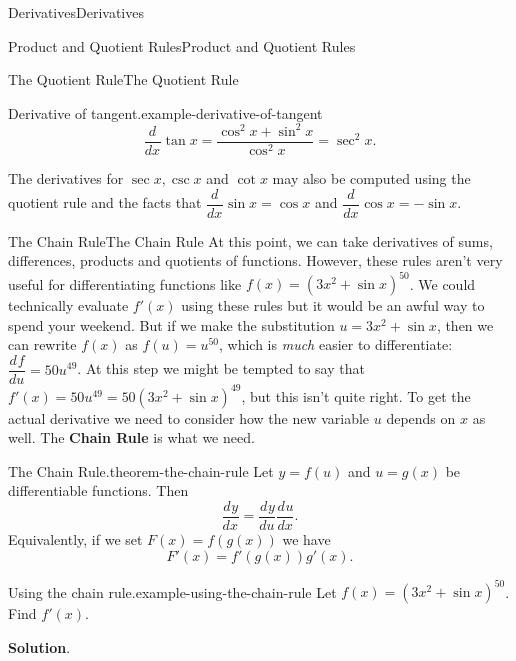 \documentclass[10pt,]{book}
\newcommand{\terminology}[1]{\textbf{#1}}
\numberwithin{equation}{section}
\newcommand{\dv}[3][]{\dfrac{d^{#1} #2}{d #3^{#1}}}
\begin{document}
\begin{chapterptx}{Derivatives}{}{Derivatives}{}{}
\begin{sectionptx}{Product and Quotient Rules}{}{Product and Quotient Rules}{}{}
\begin{subsectionptx}{The Quotient Rule}{}{The Quotient Rule}{}{}
\begin{example}{Derivative of tangent.}{example-derivative-of-tangent}
\begin{equation*}
\dv{}{x}\tan x = \frac{\cos^{2}x + \sin^{2}x}{\cos^{2}x} = \sec^{2}x.
\end{equation*}
%
\end{example}
\hypertarget{p-148}{}%
The derivatives for \(\sec x, \csc x\) and \(\cot x\) may also be computed using the quotient rule and the facts that \(\dv{}{x}\sin x = \cos x\) and \(\dv{}{x}\cos x = -\sin x\).%
\end{subsectionptx}
\end{sectionptx}
%
%
\typeout{************************************************}
\typeout{************************************************}
%
\begin{sectionptx}{The Chain Rule}{}{The Chain Rule}{}{}\label{section-the-chain-rule}
\hypertarget{p-149}{}%
At this point, we can take derivatives of sums, differences, products and quotients of functions. However, these rules aren't very useful for differentiating functions like \(f(x) = (3x^{2} + \sin x)^{50}\). We could technically evaluate \(f'(x)\) using these rules but it would be an awful way to spend your weekend. But if we make the substitution \(u = 3x^{2} + \sin x\), then we can rewrite \(f(x)\) as \(f(u) = u^{50}\), which is \emph{much} easier to differentiate: \(\dv{f}{u} = 50u^{49}\). At this step we might be tempted to say that \(f'(x) = 50u^{49} = 50(3x^{2} + \sin x)^{49}\), but this isn't quite right. To get the actual derivative we need to consider how the new variable \(u\) depends on \(x\) as well. The \terminology{Chain Rule} is what we need.%
\begin{theorem}{The Chain Rule.}{}{theorem-the-chain-rule}%
\hypertarget{p-150}{}%
Let \(y = f(u)\) and \(u = g(x)\) be differentiable functions. Then%
\begin{equation*}
\dv{y}{x} = \dv{y}{u}\dv{u}{x}.
\end{equation*}
Equivalently, if we set \(F(x) = f(g(x))\) we have%
\begin{equation*}
F'(x) = f'(g(x))g'(x).
\end{equation*}
%
\end{theorem}
\begin{example}{Using the chain rule.}{example-using-the-chain-rule}%
\hypertarget{p-151}{}%
Let \(f(x) = (3x^{2} + \sin x)^{50}\). Find \(f'(x)\).%
\par\smallskip%
\noindent\textbf{Solution}.\hypertarget{solution-30}{}\quad%
\hypertarget{p-152}{}%

\end{example}
\end{sectionptx}
\end{chapterptx}
\end{document}
